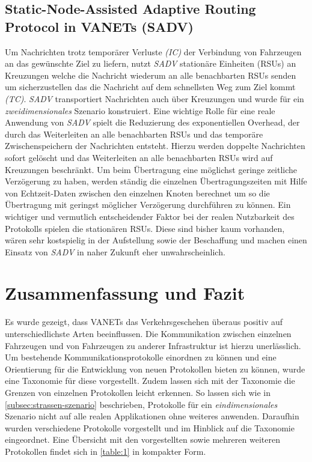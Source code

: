 \documentclass[english,runningheads,a4paper]{llncs}[2018/03/10]
\begin{document}
\subsection{Static-Node-Assisted Adaptive Routing Protocol in VANETs (SADV)}
Um Nachrichten trotz temporärer Verluste \textit{(IC)} der Verbindung von Fahrzeugen an das gewünschte Ziel zu liefern, nutzt \textit{SADV} stationäre Einheiten (RSUs) an Kreuzungen welche die Nachricht wiederum an alle benachbarten RSUs senden um sicherzustellen das die Nachricht auf dem schnellsten Weg zum Ziel kommt \textit{(TC)}.
\textit{SADV} transportiert Nachrichten auch über Kreuzungen und wurde für ein \textit{zweidimensionales} Szenario konstruiert.
Eine wichtige Rolle für eine reale Anwendung von \textit{SADV} spielt die Reduzierung des exponentiellen Overhead, der durch das Weiterleiten an alle benachbarten RSUs und das temporäre Zwischenspeichern der Nachrichten entsteht.
Hierzu werden doppelte Nachrichten sofort gelöscht und das Weiterleiten an alle benachbarten RSUs wird auf Kreuzungen beschränkt.
Um beim Übertragung eine möglichst geringe zeitliche Verzögerung zu haben, werden ständig die einzelnen Übertragungszeiten mit Hilfe von Echtzeit-Daten zwischen den einzelnen Knoten berechnet um so die Übertragung mit geringst möglicher Verzögerung durchführen zu können.
Ein wichtiger und vermutlich entscheidender Faktor bei der realen Nutzbarkeit des Protokolls spielen die stationären RSUs\cite{conti2013mobile}.
Diese sind bisher kaum vorhanden, wären sehr kostspielig in der Aufstellung sowie der Beschaffung und machen einen Einsatz von \textit{SADV} in naher Zukunft eher unwahrscheinlich.

\section{Zusammenfassung und Fazit}
\label{sec:conclusion}
Es wurde gezeigt, dass VANETs das Verkehrsgeschehen überaus positiv auf unterschiedlichste Arten beeinflussen.
Die Kommunikation zwischen einzelnen Fahrzeugen und von Fahrzeugen zu anderer Infrastruktur ist hierzu unerlässlich.
Um bestehende Kommunikationsprotokolle einordnen zu können und eine Orientierung für die Entwicklung von neuen Protokollen bieten zu können, wurde eine Taxonomie für diese vorgestellt.
Zudem lassen sich mit der Taxonomie die Grenzen von einzelnen Protokollen leicht erkennen.
So lassen sich wie in \ref{subsec:strassen-szenario} beschrieben, Protokolle für ein \textit{eindimensionales} Szenario nicht auf alle realen Applikationen ohne weiteres anwenden.
Daraufhin wurden verschiedene Protokolle vorgestellt und im Hinblick auf die Taxonomie eingeordnet.
Eine Übersicht mit den vorgestellten sowie mehreren weiteren Protokollen findet sich in \ref{table:1} in kompakter Form\cite{conti2013mobile}.
\end{document}
